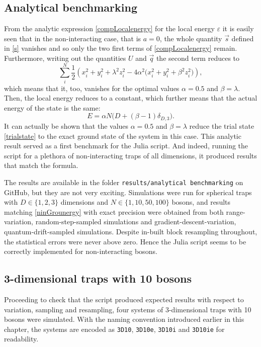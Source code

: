 \documentclass[a4paper,8pt]{article}
\begin{document}
\begin{multicols}{2}
\subsection{Analytical benchmarking}\label{benchmarking}
From the analytic expression \eqref{compLocalenergy} for the local energy $\varepsilon$ it is easily seen that in the non-interacting case, that is $a = 0$, the whole quantity $\vec{s}$ defined in \eqref{s} vanishes and so only the two first terms of \eqref{compLocalenergy} remain. Furthermore, writing out the quantities $U$ and $\vec{q}$ the second term reduces to
\begin{equation}\nonumber
	\sum_i^N \frac{1}{2}\left(x^2_i+y^2_i+\lambda^2z^2_i-4\alpha^2\Big(x^2_i+y^2_i+\beta^2z_i^2\Big)\right),
\end{equation}
which means that it, too, vanishes for the optimal values $\alpha = 0.5$ and $\beta = \lambda$. Then, the local energy reduces to a constant, which further means that the actual energy of the state is the same:
\begin{equation}\label{ninGrounergy}
 E = \alpha N \Big(D+(\beta-1)\delta_{D,3}\Big).
\end{equation}
It can actually be shown that the values $\alpha = 0.5$ and $\beta = \lambda$ reduce the trial state \eqref{trialstate} to the exact ground state of the system in this case.\cite{SWL} This analytic result served as a first benchmark for the Julia script. And indeed, running the script for a plethora of non-interacting traps of all dimensions, it produced results that match the formula.

The results are available in the folder \texttt{results/analytical benchmarking} on GitHub, but they are not very exciting. Simulations were run for spherical traps with $D \in \{1,2,3\}$ dimensions and $N \in \{1,10,50,100\}$ bosons, and results matching \eqref{ninGrounergy} with exact precision were obtained from both range-variation, random-step-sampled simulations and gradient-descent-variation, quantum-drift-sampled simulations. Despite in-built block resampling throughout, the statistical errors were never above zero. Hence the Julia script seems to be correctly implemented for non-interacting bosons.

\subsection{3-dimensional traps with 10 bosons}\label{3D10}
Proceeding to check that the script produced expected results with respect to variation, sampling and resampling, four systems of 3-dimensional traps with 10 bosons were simulated. With the naming convention introduced earlier in this chapter, the systems are encoded as \texttt{3D10}, \texttt{3D10e}, \texttt{3D10i} and \texttt{3D10ie} for readability.


\end{multicols}
\end{document}
